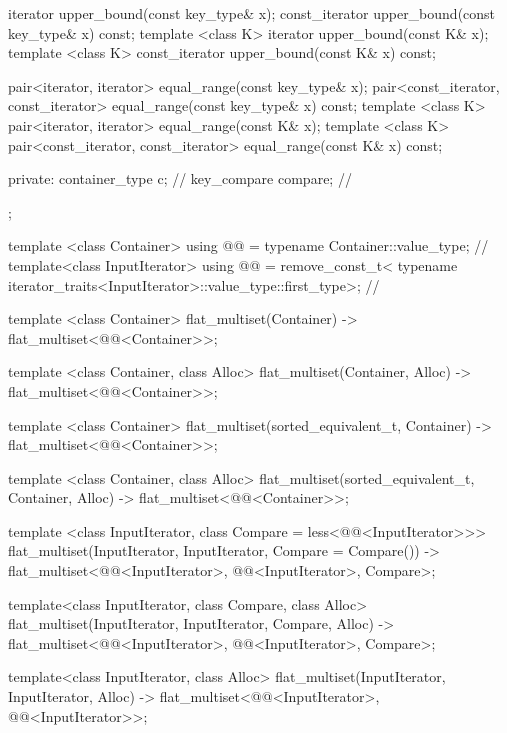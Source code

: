 \begin{codeblock}
\begin{codeblock}
\begin{codeblock}
\begin{addedblock}
\begin{codeblock}
{    iterator upper_bound(const key_type& x);
    const_iterator upper_bound(const key_type& x) const;
    template <class K> iterator upper_bound(const K& x);
    template <class K> const_iterator upper_bound(const K& x) const;

    pair<iterator, iterator> equal_range(const key_type& x);
    pair<const_iterator, const_iterator> equal_range(const key_type& x) const;
    template <class K>
      pair<iterator, iterator> equal_range(const K& x);
    template <class K>
      pair<const_iterator, const_iterator> equal_range(const K& x) const;

  private:
      container_type c;    // \expos
      key_compare compare; // \expos
  };

  template <class Container>
    using @@ = typename Container::value_type; // \expos
  template<class InputIterator>
    using @@ = remove_const_t<
      typename iterator_traits<InputIterator>::value_type::first_type>;     // \expos

  template <class Container>
    flat_multiset(Container)
      -> flat_multiset<@@<Container>>;

  template <class Container, class Alloc>
    flat_multiset(Container, Alloc)
      -> flat_multiset<@@<Container>>;

  template <class Container>
    flat_multiset(sorted_equivalent_t, Container)
      -> flat_multiset<@@<Container>>;

  template <class Container, class Alloc>
    flat_multiset(sorted_equivalent_t, Container, Alloc)
      -> flat_multiset<@@<Container>>;

  template <class InputIterator, class Compare = less<@@<InputIterator>>>
    flat_multiset(InputIterator, InputIterator, Compare = Compare())
      -> flat_multiset<@@<InputIterator>, @@<InputIterator>, Compare>;

  template<class InputIterator, class Compare, class Alloc>
    flat_multiset(InputIterator, InputIterator, Compare, Alloc)
      -> flat_multiset<@@<InputIterator>, @@<InputIterator>, Compare>;

  template<class InputIterator, class Alloc>
    flat_multiset(InputIterator, InputIterator, Alloc)
      -> flat_multiset<@@<InputIterator>, @@<InputIterator>>;


\end{codeblock}
\end{addedblock}
\end{codeblock}
\end{codeblock}
\end{codeblock}
